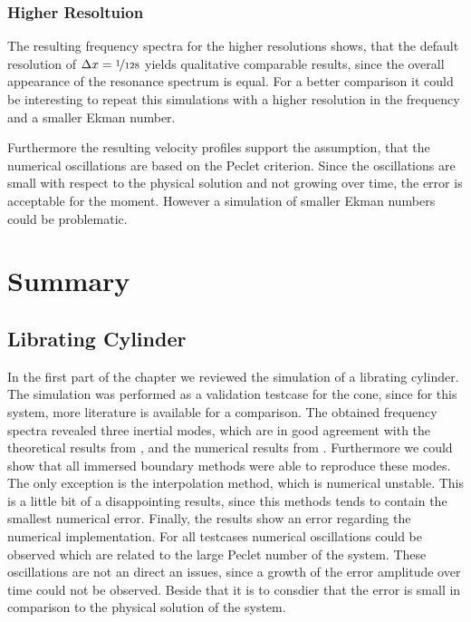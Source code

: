 \subsubsection{Higher Resoltuion}

The resulting frequency spectra for the higher resolutions shows,
that the default resolution of $\Delta x = \nicefrac{1}{128}$ yields
qualitative comparable results, since the overall appearance of the resonance spectrum
is equal.
For a better comparison it could be interesting to repeat this simulations with a
higher resolution in the frequency  and a smaller Ekman number.

Furthermore the resulting velocity profiles support the assumption,
that the numerical oscillations are based on the Peclet criterion.
Since the oscillations are small with respect to the physical solution and not
growing over time, the error is acceptable for the moment.
However a simulation of smaller Ekman numbers could be problematic.
\clearpage

\section{Summary}

\subsection{Librating Cylinder}


In the first part of the chapter we reviewed the simulation of a librating cylinder.
The simulation was performed as a validation testcase for the cone,
since for this system, more literature is available for a comparison.
The obtained frequency spectra revealed three inertial modes,
which are in good agreement with the theoretical results from \citep{Greenspan1990},  and the  numerical results from \citep{Sauret2012}.
Furthermore we could show that all immersed boundary methods were able to reproduce these modes.
The only exception is the interpolation method, which is numerical unstable.
This is a little bit of a disappointing results, since this methods tends to contain
the smallest numerical error.
Finally, the results show an error regarding the numerical implementation.
For all testcases numerical oscillations could be observed which are related to the
large Peclet number of the system.
These oscillations are not an direct an issues, since a growth of the error amplitude over time could not be observed.
Beside that it is to consdier that the error is small in comparison to the physical solution of the system.

